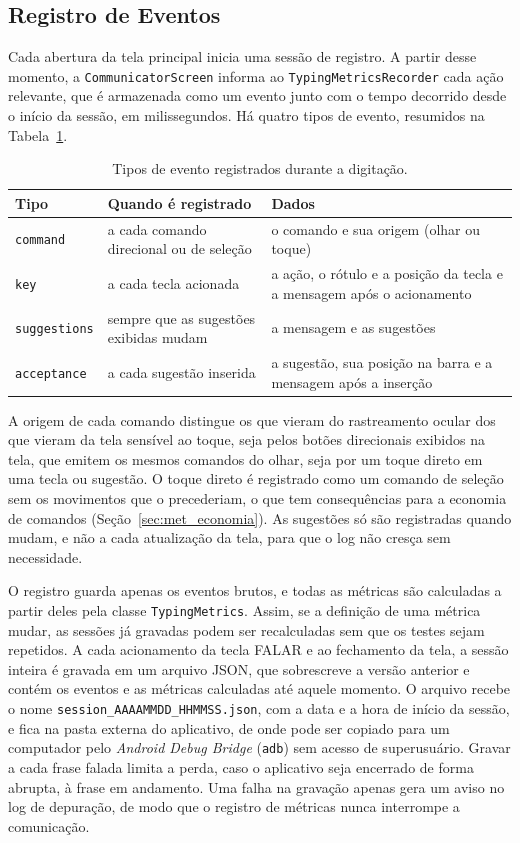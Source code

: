 \subsection{Registro de Eventos} \label{sec:met_eventos}

Cada abertura da tela principal inicia uma sessão de registro. A partir desse momento, a \texttt{CommunicatorScreen} informa ao \texttt{TypingMetricsRecorder} cada ação relevante, que é armazenada como um evento junto com o tempo decorrido desde o início da sessão, em milissegundos. Há quatro tipos de evento, resumidos na Tabela~\ref{tab:eventos}.

\begin{table}[htbp]
    \centering
    \caption{Tipos de evento registrados durante a digitação.}
    \label{tab:eventos}
    \begin{tabular}{lp{5cm}p{6cm}}
        \hline
        Tipo & Quando é registrado & Dados \\
        \hline
        \texttt{command} & a cada comando direcional ou de seleção & o comando e sua origem (olhar ou toque) \\
        \texttt{key} & a cada tecla acionada & a ação, o rótulo e a posição da tecla e a mensagem após o acionamento \\
        \texttt{suggestions} & sempre que as sugestões exibidas mudam & a mensagem e as sugestões \\
        \texttt{acceptance} & a cada sugestão inserida & a sugestão, sua posição na barra e a mensagem após a inserção \\
        \hline
    \end{tabular}
\end{table}

A origem de cada comando distingue os que vieram do rastreamento ocular dos que vieram da tela sensível ao toque, seja pelos botões direcionais exibidos na tela, que emitem os mesmos comandos do olhar, seja por um toque direto em uma tecla ou sugestão. O toque direto é registrado como um comando de seleção sem os movimentos que o precederiam, o que tem consequências para a economia de comandos (Seção~\ref{sec:met_economia}). As sugestões só são registradas quando mudam, e não a cada atualização da tela, para que o log não cresça sem necessidade.

O registro guarda apenas os eventos brutos, e todas as métricas são calculadas a partir deles pela classe \texttt{TypingMetrics}. Assim, se a definição de uma métrica mudar, as sessões já gravadas podem ser recalculadas sem que os testes sejam repetidos. A cada acionamento da tecla FALAR e ao fechamento da tela, a sessão inteira é gravada em um arquivo JSON, que sobrescreve a versão anterior e contém os eventos e as métricas calculadas até aquele momento. O arquivo recebe o nome \texttt{session\_AAAAMMDD\_HHMMSS.json}, com a data e a hora de início da sessão, e fica na pasta externa do aplicativo, de onde pode ser copiado para um computador pelo \textit{Android Debug Bridge} (\texttt{adb}) sem acesso de superusuário. Gravar a cada frase falada limita a perda, caso o aplicativo seja encerrado de forma abrupta, à frase em andamento. Uma falha na gravação apenas gera um aviso no log de depuração, de modo que o registro de métricas nunca interrompe a comunicação.

